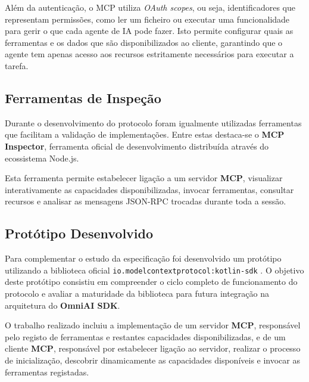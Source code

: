 Além da autenticação, o MCP utiliza \textit{OAuth scopes}, ou seja, identificadores que representam permissões, como ler um ficheiro ou executar uma funcionalidade para gerir o que cada agente de IA pode fazer. Isto permite configurar quais as ferramentas e os dados que são disponibilizados ao cliente, garantindo que o agente tem apenas acesso aos recursos estritamente necessários para executar a tarefa.

\subsection{Ferramentas de Inspeção}

Durante o desenvolvimento do protocolo foram igualmente utilizadas ferramentas
que facilitam a validação de implementações. Entre estas destaca-se o \textbf{MCP
Inspector}\cite{mcp_inspector}, ferramenta oficial de desenvolvimento distribuída através do ecossistema
Node.js.

Esta ferramenta permite estabelecer ligação a um servidor \textbf{MCP}, visualizar
interativamente as capacidades disponibilizadas, invocar ferramentas, consultar
recursos e analisar as mensagens JSON-RPC trocadas durante toda a sessão.

\subsection{Protótipo Desenvolvido}

Para complementar o estudo da especificação foi desenvolvido um protótipo utilizando
a biblioteca oficial \texttt{io.modelcontextprotocol:kotlin-sdk}
\cite{mcp_kotlin_sdk}. O objetivo deste protótipo consistiu em compreender o ciclo
completo de funcionamento do protocolo e avaliar a maturidade da biblioteca para
futura integração na arquitetura do \textbf{OmniAI SDK}.

O trabalho realizado incluiu a implementação de um servidor \textbf{MCP}, responsável
pelo registo de ferramentas e restantes capacidades disponibilizadas, e de um cliente
\textbf{MCP}, responsável por estabelecer ligação ao servidor, realizar o processo de
inicialização, descobrir dinamicamente as capacidades disponíveis e invocar as
ferramentas registadas.

